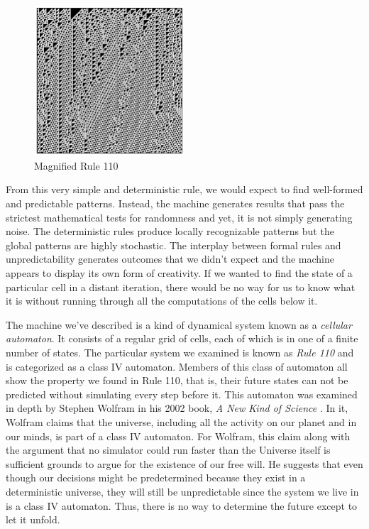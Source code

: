 \documentclass{article}
\begin{document}
\begin{figure}
  \begin{center}
    \includegraphics[width=0.5\textwidth]{class4.png}
    \caption{Magnified Rule 110}
  \end{center}
\end{figure}

From this very simple and deterministic rule, we would expect to find well-formed and predictable patterns. Instead, the machine generates results that pass the strictest mathematical tests for randomness and yet, it is not simply generating noise. The deterministic rules produce locally recognizable patterns but the global patterns are highly stochastic. The interplay between formal rules and unpredictability generates outcomes that we didn't expect and the machine appears to display its own form of creativity. If we wanted to find the state of a particular cell in a distant iteration, there would be no way for us to know what it is without running through all the computations of the cells below it. 


The machine we've described is a kind of dynamical system known as a \emph{cellular automaton}. It consists of a regular grid of cells, each of which is in one of a finite number of states. The particular system we examined is known as \emph{Rule 110} and is categorized as a class IV automaton. Members of this class of automaton all show the property we found in Rule 110, that is, their future states can not be predicted without simulating every step before it. This automaton was examined in depth by Stephen Wolfram in his 2002 book, \emph{A New Kind of Science} \cite{nks}. In it, Wolfram claims that the universe, including all the activity on our planet and in our minds, is part of a class IV automaton. For Wolfram, this claim along with the argument that no simulator could run faster than the Universe itself is sufficient grounds to argue for the existence of our free will. He suggests that even though our decisions might be predetermined because they exist in a  deterministic universe, they will still be unpredictable since the system we live in is a class IV automaton. Thus, there is no way to determine the future except to let it unfold. 
\end{document}
